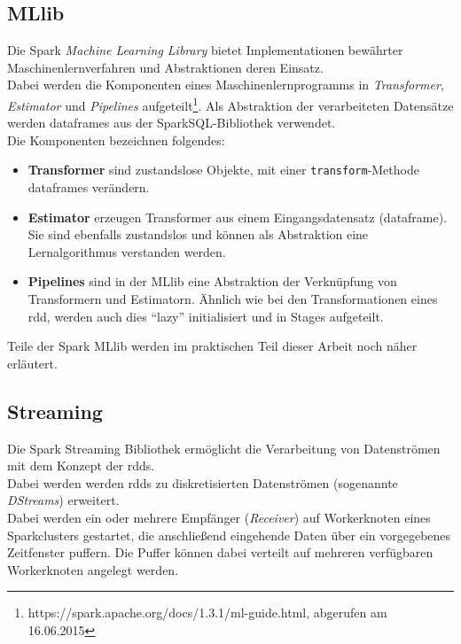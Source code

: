 \subsection{MLlib}
Die Spark \textit{Machine Learning Library} bietet Implementationen bewährter Maschinenlernverfahren und Abstraktionen deren Einsatz.\\
Dabei werden die Komponenten eines Maschinenlernprogramms in \textit{Transformer}, \textit{Estimator} und \textit{Pipelines} aufgeteilt\footnote{https://spark.apache.org/docs/1.3.1/ml-guide.html, abgerufen am 16.06.2015}. Als Abstraktion der verarbeiteten Datensätze werden \glspl{dataframe} aus der SparkSQL-Bibliothek verwendet.\\

Die Komponenten bezeichnen folgendes:
\begin{itemize}
	\item \textbf{Transformer} sind zustandslose Objekte, mit einer \lstinline|transform|-Methode \glspl{dataframe} verändern.
	\item \textbf{Estimator} erzeugen Transformer aus einem Eingangsdatensatz (\gls{dataframe}). Sie sind ebenfalls zustandslos und können als Abstraktion eine Lernalgorithmus verstanden werden.
	\item \textbf{Pipelines} sind in der MLlib eine Abstraktion der Verknüpfung von Transformern und Estimatorn. Ähnlich wie bei den Transformationen eines \gls{rdd}, werden auch dies "`lazy"' initialisiert und in Stages aufgeteilt.
\end{itemize}

Teile der Spark MLlib werden im praktischen Teil dieser Arbeit noch näher erläutert.\\

\subsection{Streaming}
Die Spark Streaming Bibliothek ermöglicht die Verarbeitung von Datenströmen mit dem Konzept der \glspl{rdd}.\\

Dabei werden werden \glspl{rdd} zu diskretisierten Datenströmen (sogenannte \textit{DStreams}) erweitert.\\

Dabei werden ein oder mehrere Empfänger (\textit{Receiver}) auf Workerknoten eines Sparkclusters gestartet, die anschließend eingehende Daten über ein vorgegebenes Zeitfenster puffern. Die Puffer können dabei verteilt auf mehreren verfügbaren Workerknoten angelegt werden.\\

